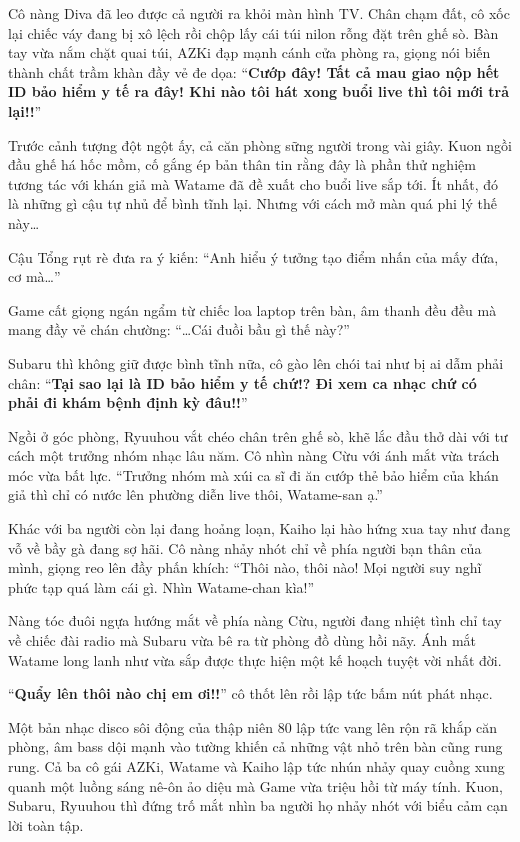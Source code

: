 \documentclass[../main.tex]{subfiles}
\begin{document}
\ct

Cô nàng Diva đã leo được cả người ra khỏi màn hình TV. Chân chạm đất, cô xốc lại chiếc váy đang bị xô lệch rồi chộp lấy cái túi nilon rỗng đặt trên ghế sò. Bàn tay vừa nắm chặt quai túi, AZKi đạp mạnh cánh cửa phòng ra, giọng nói biến thành chất trầm khàn đầy vẻ đe dọa: ``\textbf{Cướp đây! Tất cả mau giao nộp hết ID bảo hiểm y tế ra đây! Khi nào tôi hát xong buổi live thì tôi mới trả lại!!}''


Trước cảnh tượng đột ngột ấy, cả căn phòng sững người trong vài giây. Kuon ngồi đầu ghế há hốc mồm, cố gắng ép bản thân tin rằng đây là phần thử nghiệm tương tác với khán giả mà Watame đã đề xuất cho buổi live sắp tới. Ít nhất, đó là những gì cậu tự nhủ để bình tĩnh lại. Nhưng với cách mở màn quá phi lý thế này\dots

Cậu Tổng rụt rè đưa ra ý kiến: ``Anh hiểu ý tưởng tạo điểm nhấn của mấy đứa, cơ mà\dots''

Game cất giọng ngán ngẩm từ chiếc loa laptop trên bàn, âm thanh đều đều mà mang đầy vẻ chán chường: ``\dots Cái đuồi bầu gì thế này?''

Subaru thì không giữ được bình tĩnh nữa, cô gào lên chói tai như bị ai dẫm phải chân: ``\textbf{Tại sao lại là ID bảo hiểm y tế chứ!? Đi xem ca nhạc chứ có phải đi khám bệnh định kỳ đâu!!}''

Ngồi ở góc phòng, Ryuuhou vắt chéo chân trên ghế sò, khẽ lắc đầu thở dài với tư cách một trưởng nhóm nhạc lâu năm. Cô nhìn nàng Cừu với ánh mắt vừa trách móc vừa bất lực. ``Trưởng nhóm mà xúi ca sĩ đi ăn cướp thẻ bảo hiểm của khán giả thì chỉ có nước lên phường diễn live thôi, Watame-san ạ.''

Khác với ba người còn lại đang hoảng loạn, Kaiho lại hào hứng xua tay như đang vỗ về bầy gà đang sợ hãi. Cô nàng nhảy nhót chỉ về phía người bạn thân của mình, giọng reo lên đầy phấn khích: ``Thôi nào, thôi nào! Mọi người suy nghĩ phức tạp quá làm cái gì. Nhìn Watame-chan kìa!''

Nàng tóc đuôi ngựa hướng mắt về phía nàng Cừu, người đang nhiệt tình chỉ tay về chiếc đài radio mà Subaru vừa bê ra từ phòng đồ dùng hồi nãy. Ánh mắt Watame long lanh như vừa sắp được thực hiện một kế hoạch tuyệt vời nhất đời.

``\textbf{Quẩy lên thôi nào chị em ơi!!}'' cô thốt lên rồi lập tức bấm nút phát nhạc.

Một bản nhạc disco sôi động của thập niên 80 lập tức vang lên rộn rã khắp căn phòng, âm bass dội mạnh vào tường khiến cả những vật nhỏ trên bàn cũng rung rung. Cả ba cô gái AZKi, Watame và Kaiho lập tức nhún nhảy quay cuồng xung quanh một luồng sáng nê-ôn ảo diệu mà Game vừa triệu hồi từ máy tính. Kuon, Subaru, Ryuuhou thì đứng trố mắt nhìn ba người họ nhảy nhót với biểu cảm cạn lời toàn tập.
\end{document}

